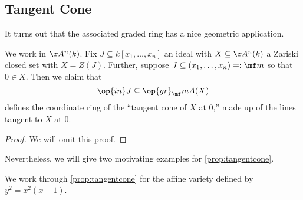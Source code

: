\subsection{Tangent Cone} 
It turns out that the associated graded ring has a nice geometric application.
\begin{prop} \label{prop:tangentcone}
	We work in $\AA^n(k)$. Fix $J\subseteq k[x_1,\ldots,x_n]$ an ideal with $X\subseteq\AA^n(k)$ a Zariski closed set with $X=Z(J)$. Further, suppose $J\subseteq(x_1,\ldots,x_n)=:\mf m$ so that $0\in X$. Then we claim that
	\[\op{in}J\subseteq\op{gr}_\mf mA(X)\]
	defines the coordinate ring of the ``tangent cone of $X$ at $0$,'' made up of the lines tangent to $X$ at $0$.
\end{prop}
\begin{proof}
	We will omit this proof.
\end{proof}
Nevertheless, we will give two motivating examples for \autoref{prop:tangentcone}.
\begin{exe}
	We work through \autoref{prop:tangentcone} for the affine variety defined by $y^2=x^2(x+1)$.
\end{exe}
